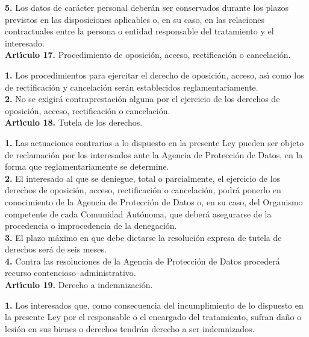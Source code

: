 {\bf 5.} Los datos de car\'acter personal deber\'an ser conservados durante los 
plazos previstos en las disposiciones aplicables o, en su caso, en las 
relaciones contractuales entre la persona o entidad responsable del tratamiento 
y el interesado.
\vspace{0.3cm}\\
{\large {\bf Art\'{\i}culo 17.} Procedimiento de oposici\'on, acceso, 
rectificaci\'on o cancelaci\'on.}

{\bf 1.} Los procedimientos para ejercitar el derecho de oposici\'on, acceso,
as\'{\i} como los de rectificaci\'on y cancelaci\'on ser\'an establecidos 
reglamentariamente.\\

{\bf 2.} No se exigir\'a contraprestaci\'on alguna por el ejercicio de los 
derechos de oposici\'on, acceso, rectificaci\'on o cancelaci\'on.
\vspace{0.3cm}\\
{\large {\bf Art\'{\i}culo 18.} Tutela de los derechos.}

{\bf 1.} Las actuaciones contrarias a lo dispuesto en la presente Ley pueden 
ser objeto de reclamaci\'on por los interesados ante la Agencia de Protecci\'on 
de Datos, en la forma que reglamentariamente se determine.\\

{\bf 2.} El interesado al que se deniegue, total o parcialmente, el ejercicio 
de los derechos de oposici\'on, acceso, rectificaci\'on o cancelaci\'on, 
podr\'a ponerlo en conocimiento de la Agencia de Protecci\'on de Datos o, en su 
caso, del Organismo competente de cada Comunidad Aut\'onoma, que deber\'a 
asegurarse de la procedencia o improcedencia de la denegaci\'on.\\

{\bf 3.} El plazo m\'aximo en que debe dictarse la resoluci\'on expresa de 
tutela de derechos ser\'a de seis meses.\\

{\bf 4.} Contra las resoluciones de la Agencia de Protecci\'on de Datos 
proceder\'a recurso contencioso--administrativo.
\vspace{0.3cm}\\
{\large {\bf Art\'{\i}culo 19.} Derecho a indemnizaci\'on.}

{\bf 1.} Los interesados que, como consecuencia del incumplimiento de lo 
dispuesto en la presente Ley por el responsable o el encargado del tratamiento,
sufran da\~no o lesi\'on en sus bienes o derechos tendr\'an derecho a ser 
indemnizados.\\

